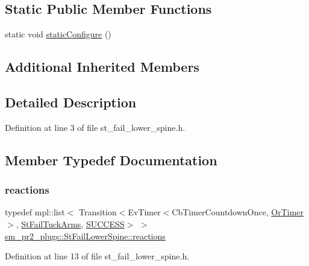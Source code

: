 \subsection*{Static Public Member Functions}
\begin{DoxyCompactItemize}
\item 
static void \hyperlink{structsm__pr2__plugs_1_1StFailLowerSpine_a11a49e55ac8e400fa3587ac15ecfb2a8}{static\+Configure} ()
\end{DoxyCompactItemize}
\subsection*{Additional Inherited Members}


\subsection{Detailed Description}


Definition at line 3 of file st\+\_\+fail\+\_\+lower\+\_\+spine.\+h.



\subsection{Member Typedef Documentation}
\mbox{\label{structsm__pr2__plugs_1_1StFailLowerSpine_a84201506710211472a927aaaf1fbffd4}} 
\subsubsection{\texorpdfstring{reactions}{reactions}}
{\footnotesize\ttfamily typedef mpl\+::list$<$ Transition$<$Ev\+Timer$<$Cb\+Timer\+Countdown\+Once, \hyperlink{classsm__pr2__plugs_1_1OrTimer}{Or\+Timer}$>$, \hyperlink{structsm__pr2__plugs_1_1StFailTuckArms}{St\+Fail\+Tuck\+Arms}, \hyperlink{classSUCCESS}{S\+U\+C\+C\+E\+SS}$>$ $>$ \hyperlink{structsm__pr2__plugs_1_1StFailLowerSpine_a84201506710211472a927aaaf1fbffd4}{sm\+\_\+pr2\+\_\+plugs\+::\+St\+Fail\+Lower\+Spine\+::reactions}}



Definition at line 13 of file st\+\_\+fail\+\_\+lower\+\_\+spine.\+h.



